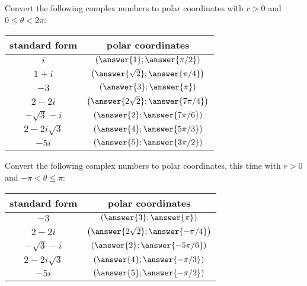 \documentclass[space,nooutcomes]{ximera}
\begin{document}

%
%


\begin{problem}
Convert the following complex numbers to polar coordinates with $r>0$ and $0\le\theta < 2\pi$:
\begin{center}
\begin{tabular}{c | c}
standard form & polar coordinates \\
\hline
  $i$ & $\left( \answer{1}; \answer{\pi/2} \right)$ \\
 $1 + i$  & $\left( \answer{\sqrt{2}}; \answer{\pi/4} \right)$ \\
 $-3$ & $\left( \answer{3}; \answer{\pi} \right)$ \\
 $2 - 2i$ & $\left( \answer{2\sqrt{2}}; \answer{7\pi/4} \right)$ \\
 $-\sqrt{3}-i$ & $\left( \answer{2}; \answer{7\pi/6} \right)$ \\
 $2 - 2i\sqrt{3}$ & $\left( \answer{4}; \answer{5\pi/3} \right)$ \\
 $-5i$ & $\left( \answer{5}; \answer{3\pi/2} \right)$ \\
 \end{tabular}
\end{center}
\end{problem}

\begin{problem}
Convert the following complex numbers to polar coordinates, this time with $r>0$ and $-\pi < \theta \le \pi$:
\begin{center}
\begin{tabular}{c | c}
standard form & polar coordinates \\
\hline
 $-3$ & $\left( \answer{3}; \answer{\pi} \right)$ \\
 $2 - 2i$ & $\left( \answer{2\sqrt{2}}; \answer{-\pi/4} \right)$ \\
 $-\sqrt{3}-i$ & $\left( \answer{2}; \answer{-5\pi/6} \right)$ \\
 $2 - 2i\sqrt{3}$ & $\left( \answer{4}; \answer{-\pi/3} \right)$ \\
 $-5i$ & $\left( \answer{5}; \answer{-\pi/2} \right)$ \\
 \end{tabular}
\end{center}
\end{problem}
\end{document}
